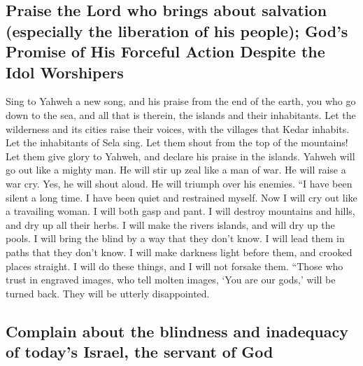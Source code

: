 \begin{paracol}{2}
\begin{otherlanguage}{english}
{\subsection{Praise the Lord who brings about salvation (especially the
liberation of his people); God's Promise of His Forceful Action Despite
the Idol
Worshipers}\label{praise-the-lord-who-brings-about-salvation-especially-the-liberation-of-his-people-gods-promise-of-his-forceful-action-despite-the-idol-worshipers}}

 Sing to Yahweh a new song, and his praise from the end
of the earth, you who go down to the sea, and all that is therein, the
islands and their inhabitants.  Let the wilderness and
its cities raise their voices, with the villages that Kedar inhabits.
Let the inhabitants of Sela sing. Let them shout from the top of the
mountains!  Let them give glory to Yahweh, and declare
his praise in the islands.  Yahweh will go out like a
mighty man. He will stir up zeal like a man of war. He will raise a war
cry. Yes, he will shout aloud. He will triumph over his enemies.
 ``I have been silent a long time. I have been quiet and
restrained myself. Now I will cry out like a travailing woman. I will
both gasp and pant.  I will destroy mountains and hills,
and dry up all their herbs. I will make the rivers islands, and will dry
up the pools.  I will bring the blind by a way that they
don't know. I will lead them in paths that they don't know. I will make
darkness light before them, and crooked places straight. I will do these
things, and I will not forsake them.  ``Those who trust
in engraved images, who tell molten images, `You are our gods,' will be
turned back. They will be utterly disappointed.

\hypertarget{complain-about-the-blindness-and-inadequacy-of-todays-israel-the-servant-of-god}{%
\subsection{Complain about the blindness and inadequacy of today's
Israel, the servant of
God}\label{complain-about-the-blindness-and-inadequacy-of-todays-israel-the-servant-of-god}}


\end{otherlanguage}
\end{paracol}
